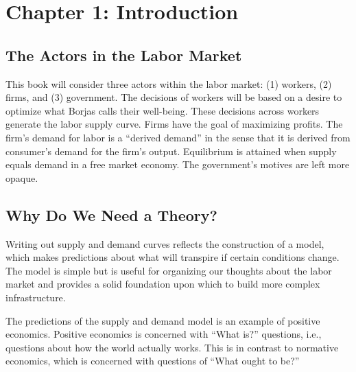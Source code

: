 \section{Chapter 1: Introduction}

\subsection{The Actors in the Labor Market}

This book will consider three 
actors within the labor market: 
(1) workers, 
(2) firms, and
(3) government.
The decisions of workers will be based on a desire 
to optimize what Borjas calls their well-being.
These decisions across workers generate the labor supply curve.
Firms have the goal of maximizing profits.
The firm's demand for labor is a ``derived demand''
in the sense that it is derived from consumer's 
demand for the firm's output.
Equilibrium is attained when supply equals demand in a 
free market economy.
The government's motives are left more opaque.

\subsection{Why Do We Need a Theory?}

Writing out supply and demand curves reflects the 
construction of a model, which makes predictions
about what will transpire if certain conditions change.
The model is simple but is useful for organizing our thoughts 
about the labor market and provides a solid foundation upon 
which to build more complex infrastructure.

The predictions of the supply and demand model
is an example of positive economics. 
Positive economics is concerned with
``What is?'' questions, i.e., 
questions about how the world actually works.
This is in contrast to normative economics,
which is concerned with
questions of ``What ought to be?''

